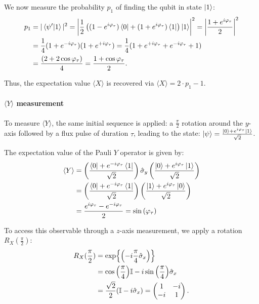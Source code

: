 We now measure the probability $p_1$ of finding the qubit in state $\ket{1}$:
\begin{align}\label{eq:P1X}
    p_1 &= |\braket{\psi'|1}|^2 = \left| \frac{1}{2} \left( (1 - e^{i\varphi_\tau})\bra{0} + (1 + e^{i\varphi_\tau})\bra{1} \right) \ket{1} \right|^2 = \left| \frac{1 + e^{i\varphi_\tau}}{2} \right|^2\\
        &= \frac{1}{4} (1+e^{-i\varphi_\tau})(1+e^{+i\varphi_\tau}) = \frac{1}{4}(1 + e^{+i\varphi_\tau} + e^{-i\varphi_\tau} +1)\\ 
        &=\frac{(2+ 2\cos{\varphi_\tau})}{4} = \frac{1 + \cos{\varphi_\tau}}{2}.
\end{align}

Thus, the expectation value $\langle X \rangle$ is recovered via $\langle X \rangle = 2\cdot p_1 - 1$.

\paragraph{$\langle Y \rangle$ measurement}
To measure $\langle Y \rangle$, the same initial sequence is applied: a $\frac{\pi}{2}$ rotation around the $y$-axis followed by a flux pulse of duration $\tau$, leading to the state: $\ket{\psi}=\frac{\ket{0} + e^{i\varphi_\tau} \ket{1}}{\sqrt{2}}$.

The expectation value of the Pauli $Y$ operator is given by:
\begin{align}
    \langle Y \rangle &= \left( \frac{\bra{0} + e^{- i\varphi_\tau} \bra{1}}{\sqrt{2}} \right) \hat{\sigma}_y \left( \frac{\ket{0} + e^{ i \varphi_\tau} \ket{1}}{\sqrt{2}} \right)\\
    &= \left( \frac{\bra{0} + e^{- i \varphi_\tau} \bra{1}}{\sqrt{2}} \right) \left( \frac{\ket{1} + e^{ i \varphi_\tau} \ket{0}}{\sqrt{2}} \right)\\
    &= \frac{e^{ i \varphi_\tau} - e^{- i\varphi_\tau}}{2} = \sin{(\varphi_\tau)}
\end{align}

To access this observable through a $z$-axis measurement, we apply a rotation $R_X(\frac{\pi}{2})$:
\begin{align}\label{eq:RX90}
    R_X(\frac{\pi}{2}) &= \exp{\left( -i\frac{\pi}{4}\hat{\sigma}_x\right)}\\
    &= \cos{\left(\frac{\pi}{4}\right)}\mathbb{I} - i\sin{\left(\frac{\pi}{4}\right)}\hat{\sigma}_x\\
    &= \frac{\sqrt{2}}{2}(\mathbb{I} -i\hat{\sigma}_x) = \begin{pmatrix}
        1 & -i \\
        -i & 1
        \end{pmatrix}.
\end{align}

